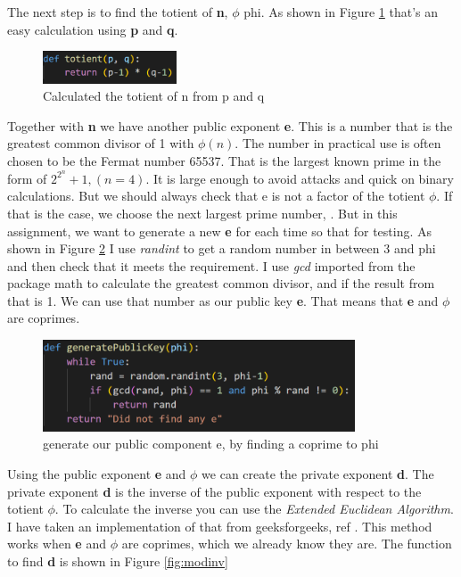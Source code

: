 \documentclass[12pt, letterpaper]{article}
\begin{document}
The next step is to find the totient of \textbf{n}, $\phi$ phi. As shown in Figure \ref{fig:totient} that's an easy calculation using \textbf{p} and \textbf{q}.

\begin{figure}[H]
  \includegraphics[width=150px]{code_snippets/totient.PNG}\centering
  \caption{Calculated the totient of n from p and q}
  \label{fig:totient}
\end{figure}

Together with \textbf{n} we have another public exponent \textbf{e}. This is a number that is the greatest common divisor of 1 with $\phi(n)$. The number in practical use is often chosen to be the Fermat number 65537. That is the largest known prime in the form of $2^{2^{n}} + 1, (n=4)$. It is large enough to avoid attacks and quick on binary calculations. But we should always check that e is not a factor of the totient $\phi$. If that is the case, we choose the next largest prime number, \cite{65537}. 
But in this assignment, we want to generate a new \textbf{e} for each time so that for testing. As shown in Figure \ref{fig:e} I use \textit{randint} to get a random number in between 3 and phi and then check that it meets the requirement. I use \textit{gcd} imported from the package math to calculate the greatest common divisor, and if the result from that is 1. We can use that number as our public key \textbf{e}. That means that \textbf{e} and $\phi$ are coprimes.

\begin{figure}[H]
  \includegraphics[width=350px]{code_snippets/gene.PNG}\centering
  \caption{generate our public component e, by finding a coprime to phi}
  \label{fig:e}
\end{figure}

Using the public exponent \textbf{e} and $\phi$ we can create the private exponent \textbf{d}. The private exponent \textbf{d} is the inverse of the public exponent with respect to the totient $\phi$. To calculate the inverse you can use the \textit{Extended Euclidean Algorithm}. I have taken an implementation of that from geeksforgeeks, ref \cite{modinv}. This method works when \textbf{e} and $\phi$ are coprimes, which we already know they are. The function to find \textbf{d} is shown in Figure \ref{fig:modinv}
\end{document}
